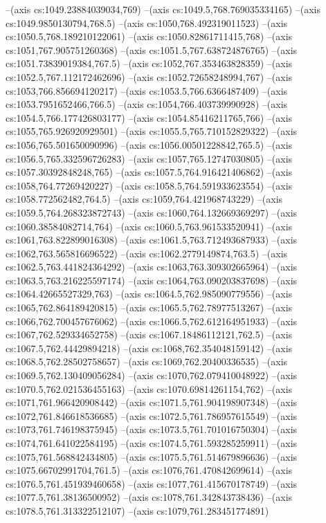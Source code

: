 --(axis cs:1049.23884039034,769)
--(axis cs:1049.5,768.769035334165)
--(axis cs:1049.9850130794,768.5)
--(axis cs:1050,768.492319011523)
--(axis cs:1050.5,768.189210122061)
--(axis cs:1050.82861711415,768)
--(axis cs:1051,767.905751260368)
--(axis cs:1051.5,767.638724876765)
--(axis cs:1051.73839019384,767.5)
--(axis cs:1052,767.353463828359)
--(axis cs:1052.5,767.112172462696)
--(axis cs:1052.72658248994,767)
--(axis cs:1053,766.856694120217)
--(axis cs:1053.5,766.6366487409)
--(axis cs:1053.7951652466,766.5)
--(axis cs:1054,766.403739990928)
--(axis cs:1054.5,766.177426803177)
--(axis cs:1054.85416211765,766)
--(axis cs:1055,765.926920929501)
--(axis cs:1055.5,765.710152829322)
--(axis cs:1056,765.501650090996)
--(axis cs:1056.00501228842,765.5)
--(axis cs:1056.5,765.332596726283)
--(axis cs:1057,765.12747030805)
--(axis cs:1057.30392848248,765)
--(axis cs:1057.5,764.916421406862)
--(axis cs:1058,764.77269420227)
--(axis cs:1058.5,764.591933623554)
--(axis cs:1058.772562482,764.5)
--(axis cs:1059,764.421968743229)
--(axis cs:1059.5,764.268323872743)
--(axis cs:1060,764.132669369297)
--(axis cs:1060.38584082714,764)
--(axis cs:1060.5,763.961533520941)
--(axis cs:1061,763.822899016308)
--(axis cs:1061.5,763.712493687933)
--(axis cs:1062,763.565816696522)
--(axis cs:1062.2779149874,763.5)
--(axis cs:1062.5,763.441824364292)
--(axis cs:1063,763.309302665964)
--(axis cs:1063.5,763.216225597174)
--(axis cs:1064,763.090203837698)
--(axis cs:1064.42665527329,763)
--(axis cs:1064.5,762.985090779556)
--(axis cs:1065,762.864189420815)
--(axis cs:1065.5,762.78977513267)
--(axis cs:1066,762.700457676062)
--(axis cs:1066.5,762.612164951933)
--(axis cs:1067,762.529334652758)
--(axis cs:1067.18486112121,762.5)
--(axis cs:1067.5,762.44429894218)
--(axis cs:1068,762.354048159142)
--(axis cs:1068.5,762.28502758657)
--(axis cs:1069,762.20400336535)
--(axis cs:1069.5,762.130409056284)
--(axis cs:1070,762.079410048922)
--(axis cs:1070.5,762.021536455163)
--(axis cs:1070.69814261154,762)
--(axis cs:1071,761.966420908442)
--(axis cs:1071.5,761.904198907348)
--(axis cs:1072,761.846618536685)
--(axis cs:1072.5,761.786957615549)
--(axis cs:1073,761.746198375945)
--(axis cs:1073.5,761.701016750304)
--(axis cs:1074,761.641022584195)
--(axis cs:1074.5,761.593285259911)
--(axis cs:1075,761.568842434805)
--(axis cs:1075.5,761.514679896636)
--(axis cs:1075.66702991704,761.5)
--(axis cs:1076,761.470842699614)
--(axis cs:1076.5,761.451939460658)
--(axis cs:1077,761.415670178749)
--(axis cs:1077.5,761.38136500952)
--(axis cs:1078,761.342843738436)
--(axis cs:1078.5,761.313322512107)
--(axis cs:1079,761.283451774891)
